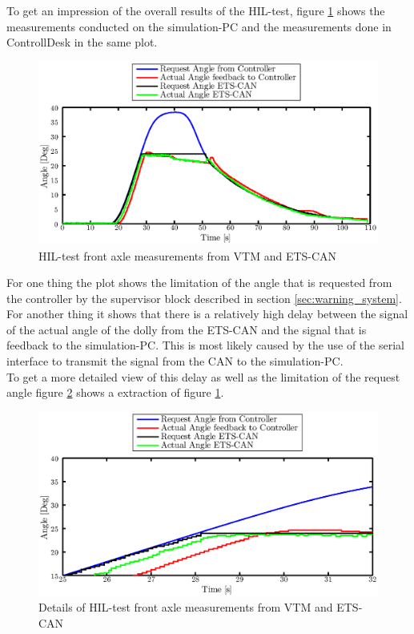 \documentclass[ExampleMasters.tex]{subfiles}
\begin{document}
To get an impression of the overall results of the \gls{HIL}-test, figure \ref{fig:HIL002_complete} shows the measurements conducted on the simulation-PC and the measurements done in ControllDesk in the same plot. 
\begin{figure}[!htb]
	\centering
	\includegraphics[width=1\linewidth]{figures/HIL006_alles}
	\caption{\acrlong{HIL}-test front axle measurements from VTM and ETS-CAN}	
	\label{fig:HIL002_complete}
\end{figure}

For one thing the plot shows the limitation of the angle that is requested from the controller by the supervisor block described in section \ref{sec:warning_system}. For another thing it shows that there is a relatively high delay between the signal of the actual angle of the dolly from the \gls{ETS}-\gls{CAN} and the signal that is feedback to the simulation-PC. This is most likely caused by the use of the serial interface to transmit the signal from the CAN to the simulation-PC. \\
To get a more detailed view of this delay as well as the limitation of the request angle figure \ref{fig:HIL002_complete_details} shows a extraction of figure \ref{fig:HIL002_complete}.   

\begin{figure}[!htb]
	\centering
	\includegraphics[width=1\linewidth]{figures/HIL006_alles_details}
	\caption{Details of \acrlong{HIL}-test front axle measurements from \acrshort{VTM} and \acrshort{ETS}-\acrshort{CAN}}
	
	\label{fig:HIL002_complete_details}
\end{figure}
\end{document}
